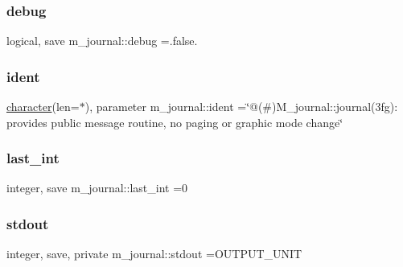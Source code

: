 \subsubsection{\texorpdfstring{debug}{debug}}
{\footnotesize\ttfamily logical, save m\+\_\+journal\+::debug =.false.\hspace{0.3cm}{\ttfamily [private]}}

\mbox{\label{namespacem__journal_a4e2131bb2d66050e0a9a37632579c9fc}} 
\subsubsection{\texorpdfstring{ident}{ident}}
{\footnotesize\ttfamily \hyperlink{option__stopwatch_83_8txt_abd4b21fbbd175834027b5224bfe97e66}{character}(len=$\ast$), parameter m\+\_\+journal\+::ident =\char`\"{}@(\#)M\+\_\+journal\+::journal(3fg)\+: provides public message routine, no paging or graphic mode change\char`\"{}\hspace{0.3cm}{\ttfamily [private]}}

\mbox{\label{namespacem__journal_a47e8e34dc4072b04101027394d688519}} 
\subsubsection{\texorpdfstring{last\+\_\+int}{last\_int}}
{\footnotesize\ttfamily integer, save m\+\_\+journal\+::last\+\_\+int =0\hspace{0.3cm}{\ttfamily [private]}}

\mbox{\label{namespacem__journal_a664cf3fd85385b776d30ea589606ad1c}} 
\subsubsection{\texorpdfstring{stdout}{stdout}}
{\footnotesize\ttfamily integer, save, private m\+\_\+journal\+::stdout =O\+U\+T\+P\+U\+T\+\_\+\+U\+N\+IT\hspace{0.3cm}{\ttfamily [private]}}

